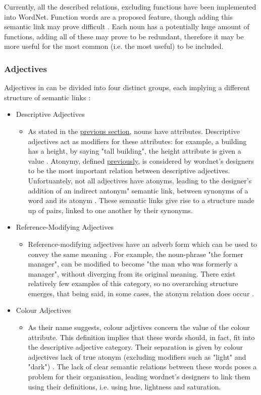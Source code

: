 \documentclass[]{article}
\begin{document}
Currently, all the described relations, excluding functions have been implemented into WordNet. Function words are a proposed feature, though adding this semantic link may prove difficult \cite{WN2Nouns}. Each noun has a potentially huge amount of functions, adding all of these may prove to be redundant, therefore it may be more useful for the most common (i.e. the most useful) to be included.

\subsubsection{Adjectives}
\label{Adjectives}
Adjectives in can be divided into four distinct groups, each implying a different structure of semantic links \cite{WN3Adjectives}:
\begin{itemize}
	\item Descriptive Adjectives
	\begin{itemize}
		\item As stated in the \hyperref[Nouns]{previous section}, nouns have attributes. Descriptive adjectives act as modifiers for these attributes: for example, a building has a height, by saying "tall building", the height attribute is given a value \cite{WN3Adjectives}. Atonymy, defined \hyperref[Atonym]{previously}, is considered by wordnet's designers to be the most important relation between descriptive adjectives. Unfortuantely, not all adjectives have atonyms, leading to the designer's addition of an indirect antonym" semantic link, between synonyms of a word and its atonym \cite{WN3Adjectives}. These semantic links give rise to a structure made up of pairs, linked to one another by their synonyms.
	\end{itemize}		
		
	\item Reference-Modifying Adjectives
	\begin{itemize}
		\item Reference-modifying adjectives have an adverb form which can be used to convey the same meaning \cite{WN3Adjectives}. For example, the noun-phrase "the former manager", can be modified to become "the man who was formerly a manager", without diverging from its original meaning. There exist relatively few examples of this category, so no overarching structure emerges, that being said, in some cases, the atonym relation does occur \cite{WN3Adjectives}.
	\end{itemize}
	
	\item Colour Adjectives
	\begin{itemize}
		\item As their name suggests, colour adjctives concern the value of the colour attribute. This definition implies that these words should, in fact, fit into the descriptive adjective category. Their separation is given by colour adjectives lack of true atonym (excluding modifiers such as "light" and "dark") \cite{WN3Adjectives}. The lack of clear semantic relations between these words poses a problem for their organisation, leading wordnet's designers to link them using their definitions, i.e. using hue, lightness and saturation.
	\end{itemize}	
	

\end{itemize}
\end{document}
